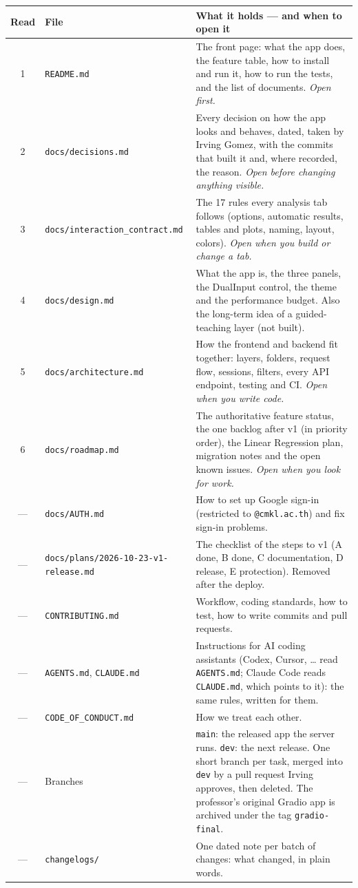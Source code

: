 \documentclass[11pt,a4paper]{article}
\newcommand{\f}[1]{\texttt{#1}}
\begin{document}
\begin{center}
\begin{tabularx}{\textwidth}{@{}c>{\raggedright\arraybackslash}p{4.75cm}L@{}}
\toprule
\textbf{Read} & \textbf{File} & \textbf{What it holds — and when to open it} \\
 & \f{README.md} & The front page: what the app does, the feature table, how to install and run it, how to run the tests, and the list of documents. \emph{Open first.} \\
2 & \f{docs/decisions.md} & Every decision on how the app looks and behaves, dated, taken by Irving Gomez, with the commits that built it and, where recorded, the reason. \emph{Open before changing anything visible.} \\
3 & \f{docs/interaction\_}\newline\f{contract.md} & The 17 rules every analysis tab follows (options, automatic results, tables and plots, naming, layout, colors). \emph{Open when you build or change a tab.} \\
4 & \f{docs/design.md} & What the app is, the three panels, the DualInput control, the theme and the performance budget. Also the long-term idea of a guided-teaching layer (not built). \\
5 & \f{docs/architecture.md} & How the frontend and backend fit together: layers, folders, request flow, sessions, filters, every API endpoint, testing and CI. \emph{Open when you write code.} \\
6 & \f{docs/roadmap.md} & The authoritative feature status, the one backlog after v1 (in priority order), the Linear Regression plan, migration notes and the open known issues. \emph{Open when you look for work.} \\
— & \f{docs/AUTH.md} & How to set up Google sign-in (restricted to \f{@cmkl.ac.th}) and fix sign-in problems. \\
— & \f{docs/plans/}\newline\f{2026-10-23-v1-release.md} & The checklist of the steps to v1 (A done, B done, C documentation, D release, E protection). Removed after the deploy. \\
— & \f{CONTRIBUTING.md} & Workflow, coding standards, how to test, how to write commits and pull requests. \\
— & \f{AGENTS.md}, \f{CLAUDE.md} & Instructions for AI coding assistants (Codex, Cursor, … read \f{AGENTS.md}; Claude Code reads \f{CLAUDE.md}, which points to it): the same rules, written for them. \\
— & \f{CODE\_OF\_CONDUCT.md} & How we treat each other. \\
— & Branches & \f{main}: the released app the server runs. \f{dev}: the next release. One short branch per task, merged into \f{dev} by a pull request Irving approves, then deleted. The professor's original Gradio app is archived under the tag \f{gradio-final}. \\
— & \f{changelogs/} & One dated note per batch of changes: what changed, in plain words. \\
\bottomrule
\end{tabularx}
\end{center}
\end{document}
